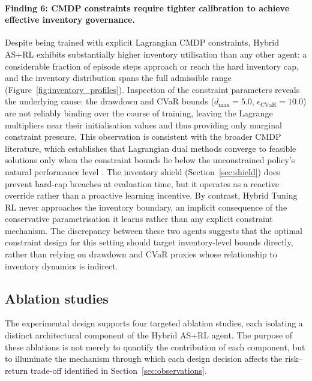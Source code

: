 \documentclass[11pt]{article}
\begin{document}
\paragraph{Finding 6: CMDP constraints require tighter calibration to
  achieve effective inventory governance.}
Despite being trained with explicit Lagrangian CMDP constraints, Hybrid
AS+RL exhibits substantially higher inventory utilisation than any other
agent: a considerable fraction of episode steps approach or reach the
hard inventory cap, and the inventory distribution spans the full
admissible range (Figure~\ref{fig:inventory_profiles}).
Inspection of the constraint parameters reveals the underlying cause:
the drawdown and CVaR bounds ($d_{\max} = 5.0$,
$\epsilon_{\text{CVaR}} = 10.0$) are not reliably binding over the
course of training, leaving the Lagrange multipliers near their
initialisation values and thus providing only marginal constraint
pressure.
This observation is consistent with the broader CMDP literature, which
establishes that Lagrangian dual methods converge to feasible solutions
only when the constraint bounds lie below the unconstrained policy's
natural performance level \parencite{altschuler2024multi,guilbaud2013optimal}.
The inventory shield (Section~\ref{sec:shield}) does prevent hard-cap
breaches at evaluation time, but it operates as a reactive override
rather than a proactive learning incentive.
By contrast, Hybrid Tuning RL never approaches the inventory boundary,
an implicit consequence of the conservative parametrisation it learns
rather than any explicit constraint mechanism.
The discrepancy between these two agents suggests that the optimal
constraint design for this setting should target inventory-level bounds
directly, rather than relying on drawdown and CVaR proxies whose
relationship to inventory dynamics is indirect.

\subsection{Ablation studies}
\label{sec:ablations}

The experimental design supports four targeted ablation studies, each
isolating a distinct architectural component of the Hybrid AS+RL agent.
The purpose of these ablations is not merely to quantify the contribution
of each component, but to illuminate the mechanism through which each
design decision affects the risk--return trade-off identified in
Section~\ref{sec:observations}.
\end{document}

